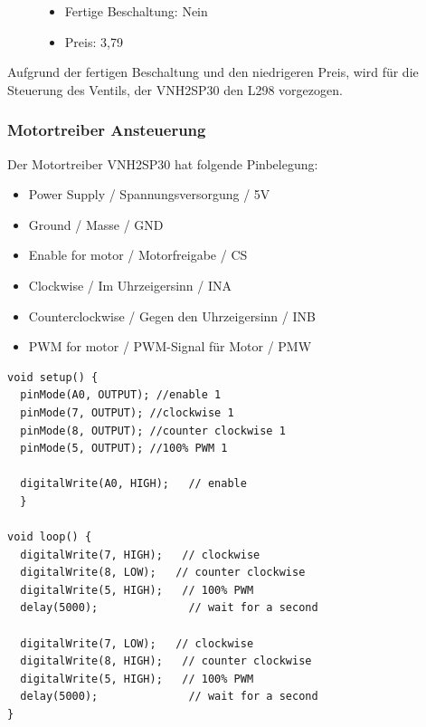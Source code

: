 \begin{figure}
\begin{minipage}[t]{0.6\textwidth}
\begin{itemize}
	\item{Fertige Beschaltung: Nein}
	\item{Preis: 3,79\textsf{\texteuro}} %
\end{itemize}

\end{minipage}
\end{figure} 

Aufgrund der fertigen Beschaltung und den niedrigeren Preis, wird für die Steuerung des Ventils, der VNH2SP30 den L298 vorgezogen. 

\subsubsection{Motortreiber Ansteuerung}
\label{sec:motortreiberAnsteuerung}

Der Motortreiber VNH2SP30 hat folgende Pinbelegung:

\begin{itemize}
	\item{Power Supply / Spannungsversorgung / 5V}
	\item{Ground / Masse / GND}
	\item{Enable for motor / Motorfreigabe / CS}
	\item{Clockwise / Im Uhrzeigersinn / INA}
	\item{Counterclockwise / Gegen den Uhrzeigersinn / INB}
	\item{PWM for motor / PWM-Signal für Motor / PMW}
\end{itemize}

\begin{lstlisting}
void setup() {
  pinMode(A0, OUTPUT); //enable 1
  pinMode(7, OUTPUT); //clockwise 1
  pinMode(8, OUTPUT); //counter clockwise 1
  pinMode(5, OUTPUT); //100% PWM 1
  
  digitalWrite(A0, HIGH);   // enable
  }

void loop() {
  digitalWrite(7, HIGH);   // clockwise
  digitalWrite(8, LOW);   // counter clockwise 
  digitalWrite(5, HIGH);   // 100% PWM
  delay(5000);              // wait for a second
  
  digitalWrite(7, LOW);   // clockwise
  digitalWrite(8, HIGH);   // counter clockwise 
  digitalWrite(5, HIGH);   // 100% PWM
  delay(5000);              // wait for a second
}
\end{lstlisting}

